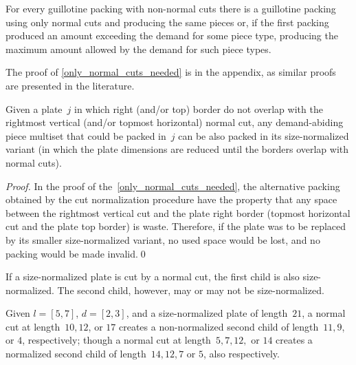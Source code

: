 \documentclass[runningheads]{llncs}
\begin{document}
\begin{theorem}\label{only_normal_cuts_needed}
For every guillotine packing with non-normal cuts there is a guillotine packing using only normal cuts and producing the same pieces or, if the first packing produced an amount exceeding the demand for some piece type, producing the maximum amount allowed by the demand for such piece types.
\end{theorem}

The proof of \autoref{only_normal_cuts_needed} is in the appendix, as similar proofs are presented in the literature.

\begin{corollary}\label{co:size_normalized_plate}
Given a plate~\(j\) in which right (and/or top) border do not overlap with the rightmost vertical (and/or topmost horizontal) normal cut, any demand-abiding piece multiset that could be packed in~\(j\) can be also packed in its size-normalized variant (in which the plate dimensions are reduced until the borders overlap with normal cuts).
\end{corollary}

\begin{proof}
In the proof of the~\autoref{only_normal_cuts_needed}, the alternative packing obtained by the cut normalization procedure have the property that any space between the rightmost vertical cut and the plate right border (topmost horizontal cut and the plate top border) is waste. Therefore, if the plate was to be replaced by its smaller size-normalized variant, no used space would be lost, and no packing would be made invalid.\qed
\end{proof}

\begin{remark}
If a size-normalized plate is cut by a normal cut, the first child is also size-normalized. The second child, however, may or may not be size-normalized.
\end{remark}


\begin{example}
Given \(l = [5, 7]\), \(d = [2, 3]\), and a size-normalized plate of length~\(21\), a normal cut at length~\(10, 12\), or \(17\) creates a non-normalized second child of length~\(11, 9\), or \(4\), respectively; though a normal cut at length~\(5, 7, 12,\) or \(14\) creates a normalized second child of length~\(14, 12, 7\) or \(5\), also respectively.
\end{example}
\end{document}
